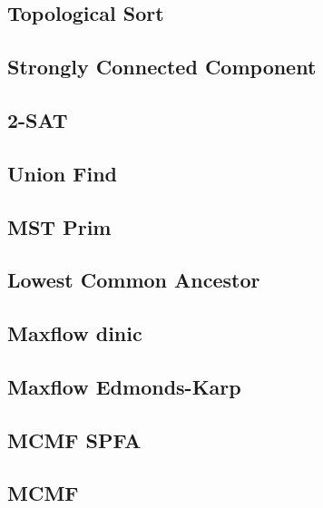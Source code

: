 \documentclass[10pt,landscape,a4paper,twocolumn]{article}
\begin{document}
\subsection{Topological Sort}


\subsection{Strongly Connected Component}


\subsection{2-SAT}


\subsection{Union Find}


\subsection{MST Prim}


\subsection{Lowest Common Ancestor}



\subsection{Maxflow dinic}


\subsection{Maxflow Edmonds-Karp}


\subsection{MCMF SPFA}


\subsection{MCMF}

\end{document}
